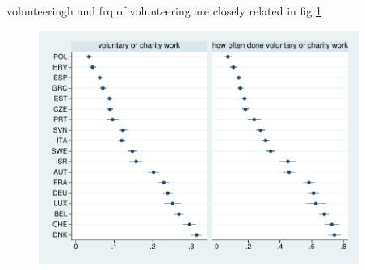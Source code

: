 \documentclass[10pt, letterpaper]{article}
\begin{document}
\begin{spacing}{1.4}







volunteeringh and frq of volunteering are closely related in fig \ref{volCha-volChaOft-means}

\begin{figure}[H]
 \includegraphics[height=3in]{tmp/volCha-volChaOft-means.pdf}\centering\label{volCha-volChaOft-means}
\caption{}
\end{figure}


\end{spacing}
\end{document}

